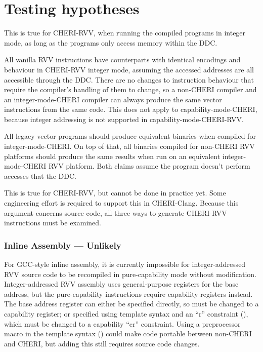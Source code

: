 \section{Testing hypotheses}\label{chap:software:sec:hypotheses}

This is true for CHERI-RVV, when running the compiled programs in integer mode, as long as the programs only access memory within the DDC.

All vanilla RVV instructions have counterparts with identical encodings and behaviour in CHERI-RVV integer mode, assuming the accessed addresses are all accessible through the DDC.
There are no changes to instruction behaviour that require the compiler's handling of them to change, so a non-CHERI compiler and an integer-mode-CHERI compiler can always produce the same vector instructions from the same code.
This does not apply to capability-mode-CHERI, because integer addressing is not supported in capability-mode-CHERI-RVV.

All legacy vector programs should produce equivalent binaries when compiled for integer-mode-CHERI.
On top of that, all binaries compiled for non-CHERI RVV platforms should produce the same results when run on an equivalent integer-mode-CHERI RVV platform.
Both claims assume the program doesn't perform accesses that  the DDC.

This is true for CHERI-RVV, but cannot be done in practice yet.
Some engineering effort is required to support this in CHERI-Clang.
Because this argument concerns source code, all three ways to generate CHERI-RVV instructions must be examined.

\subsubsection*{Inline Assembly --- Unlikely}
For GCC-style inline assembly, it is currently impossible for integer-addressed RVV source code to be recompiled in pure-capability mode without modification.
Integer-addressed RVV assembly uses general-purpose registers for the base address, but the pure-capability instructions require capability registers instead.
The base address register can either be specified directly, so must be changed to a capability register; or specified using template syntax and an ``r'' constraint (), which must be changed to a capability ``cr'' constraint.
Using a preprocessor macro in the template syntax () could make code portable between non-CHERI and CHERI, but adding this still requires source code changes.

